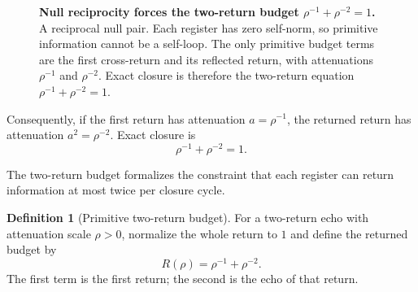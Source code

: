 \documentclass[11pt,a4paper]{article}
\theoremstyle{plain}
\theoremstyle{definition}
\newtheorem{definition}[theorem]{Definition}
\theoremstyle{remark}
\numberwithin{equation}{section}
\begin{document}
\begin{figure}[ht]
\centering
{}
\caption{\textbf{Null reciprocity forces the two-return budget
\(\rho^{-1}+\rho^{-2}=1\).}  A reciprocal null pair.  Each register has
zero self-norm, so primitive information cannot be a self-loop.  The
only primitive budget terms are the first cross-return and its
reflected return, with attenuations \(\rho^{-1}\) and \(\rho^{-2}\).
Exact closure is therefore the two-return equation
\(\rho^{-1}+\rho^{-2}=1\).}
\label{fig:null-echo-pair}
\end{figure}

Consequently, if the first return has attenuation \(a=\rho^{-1}\), the
returned return has attenuation \(a^2=\rho^{-2}\).  Exact closure is
\[
  \rho^{-1}+\rho^{-2}=1.
\]

\medskip\noindent The two-return budget formalizes the constraint that each register can return information at most twice per closure cycle.

\begin{definition}[Primitive two-return budget]
\label{def:two-return-budget}
For a two-return echo with attenuation scale \(\rho>0\), normalize the
whole return to \(1\) and define the returned budget by
\[
  R(\rho)=\rho^{-1}+\rho^{-2}.
\]
The first term is the first return; the second is the echo of that
return.
\end{definition}
\end{document}
